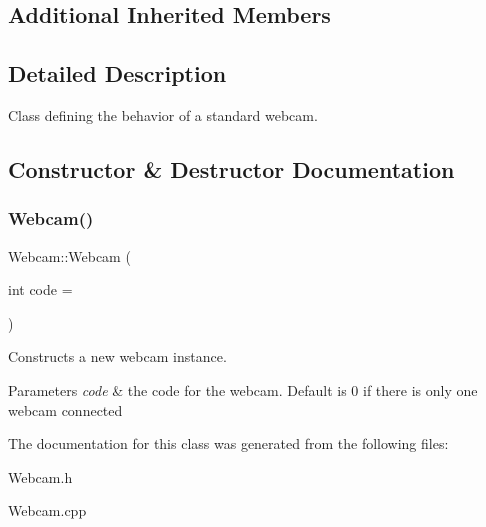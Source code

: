 \subsection*{Additional Inherited Members}


\subsection{Detailed Description}
Class defining the behavior of a standard webcam. 

\subsection{Constructor \& Destructor Documentation}
\hypertarget{class_webcam_ae3694760a88e8975940045ec8d4c27ed}{}\label{class_webcam_ae3694760a88e8975940045ec8d4c27ed} 
\subsubsection{\texorpdfstring{Webcam()}{Webcam()}}
{\footnotesize\ttfamily Webcam\+::\+Webcam (\begin{DoxyParamCaption}\item[{int}]{code = {} }\end{DoxyParamCaption})}



Constructs a new webcam instance. 


\begin{DoxyParams}{Parameters}
{\em code} & the code for the webcam. Default is 0 if there is only one webcam connected \\
\hline
\end{DoxyParams}


The documentation for this class was generated from the following files\+:\begin{DoxyCompactItemize}
\item 
Webcam.\+h\item 
Webcam.\+cpp\end{DoxyCompactItemize}
